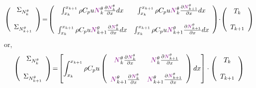 \[
\left(
\begin{array}{c}
{\Sigma}_{N_k^\theta}  \\ \\ {\Sigma}_{N_{k+1}^\theta}
\end{array}
\right)
\!=\!
\left(
\begin{array}{cc}
\int_{x_k}^{x_{k+1}} \rho C_p u {\color{violet}N}_k^\theta \frac{\partial      {\color{violet}N}_{k}^\theta }{\partial x} dx  & 
\int_{x_k}^{x_{k+1}} \rho C_p u {\color{violet}N}_k^\theta \frac{\partial      {\color{violet}N}_{k+1}^\theta }{\partial x} dx \\ \\
\int_{x_k}^{x_{k+1}} \rho C_p u {\color{violet}N}_{k+1}^\theta \frac{\partial  {\color{violet}N}_{k}^\theta }{\partial x} dx  & 
\int_{x_k}^{x_{k+1}} \rho C_p u {\color{violet}N}_{k+1}^\theta \frac{\partial  {\color{violet}N}_{k+1}^\theta }{\partial x} dx 
\end{array}
\right)
\!\cdot\!
\left(
\begin{array}{c}
{T}_k \\ \\
{T}_{k+1}
\end{array}
\right)
\]
or,
\[
\left(
\begin{array}{c}
{\Sigma}_{N_k^\theta} \\ \\ {\Sigma}_{N_{k+1}^\theta}
\end{array}
\right)
\!=\!
\left[
\int_{x_k}^{x_{k+1}}
\rho C_p u
\left(
\begin{array}{cc}
{\color{violet}N}_k^\theta \frac{\partial     {\color{violet}N}_{k}^\theta }{\partial x}   & 
{\color{violet}N}_k^\theta \frac{\partial     {\color{violet}N}_{k+1}^\theta }{\partial x}  \\ \\
{\color{violet}N}_{k+1}^\theta \frac{\partial {\color{violet}N}_{k}^\theta }{\partial x}   & 
{\color{violet}N}_{k+1}^\theta \frac{\partial {\color{violet}N}_{k+1}^\theta }{\partial x} 
\end{array}
\right)
dx
\right]
\cdot
\left(
\begin{array}{c}
{T}_k \\ \\ 
{T}_{k+1}
\end{array}
\right)
\]

